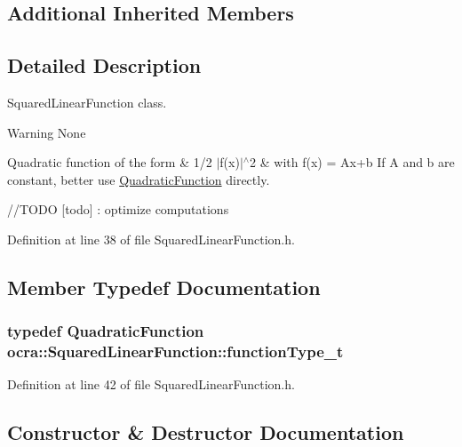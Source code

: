 \subsection*{Additional Inherited Members}


\subsection{Detailed Description}
Squared\+Linear\+Function class. 

\begin{DoxyWarning}{Warning}
None
\end{DoxyWarning}
Quadratic function of the form \& 1/2 $|$f(x)$|$$^\wedge$2 \& with f(x) = Ax+b If A and b are constant, better use \hyperlink{classocra_1_1QuadraticFunction}{Quadratic\+Function} directly.

//\+T\+O\+DO \mbox{[}todo\mbox{]} \+: optimize computations 

Definition at line 38 of file Squared\+Linear\+Function.\+h.



\subsection{Member Typedef Documentation}
\subsubsection[{\texorpdfstring{function\+Type\+\_\+t}{functionType_t}}]{\setlength{\rightskip}{0pt plus 5cm}typedef {\bf Quadratic\+Function} {\bf ocra\+::\+Squared\+Linear\+Function\+::function\+Type\+\_\+t}}\hypertarget{classocra_1_1SquaredLinearFunction_a7f1e0d7cfae65a8111bf6615f8c24f19}{}\label{classocra_1_1SquaredLinearFunction_a7f1e0d7cfae65a8111bf6615f8c24f19}


Definition at line 42 of file Squared\+Linear\+Function.\+h.



\subsection{Constructor \& Destructor Documentation}
